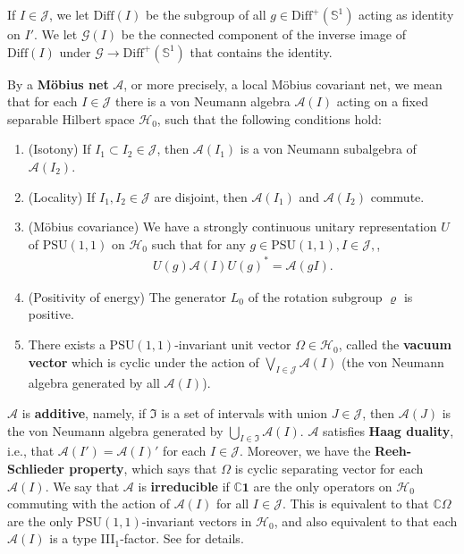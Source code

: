 \documentclass[11pt,b5paper,notitlepage]{article}
\theoremstyle{definition}
\theoremstyle{plain}
\newcommand{\fk}{\mathfrak}
\newcommand{\mc}{\mathcal}
\newcommand{\id}{\mathbf{1}}
\newcommand{\Diffp}{\mathrm{Diff}^+}
\newcommand{\Diff}{\mathrm{Diff}}
\newcommand{\PSU}{\mathrm{PSU}(1,1)}
\newcommand{\scr}{\mathscr}
\newcommand{\mbb}{\mathbb}
\newcommand{\Cbb}{\mathbb C}
\newcommand{\Sbb}{{\mathbb S}}
\numberwithin{equation}{section}
\begin{document}
If $I\in\mc J$, we let $\Diff(I)$ be the subgroup of all $g\in\Diffp(\mbb S^1)$ acting as identity on $I'$. We let $\scr G(I)$ be the connected component of the inverse image of $\Diff(I)$ under $\scr G\rightarrow\Diffp(\Sbb^1)$ that contains the identity.

By a  \textbf{M\"obius net} $\mc A$, or more precisely, a local M\"obius covariant net, we mean that for each $I\in\mathcal J$ there is a von Neumann algebra $\mathcal A(I)$ acting on a fixed separable Hilbert space $\mathcal H_0$, such that the following conditions hold:
\begin{enumerate}[label=(\alph*)]
\item (Isotony) If $I_1\subset I_2\in\mathcal J$, then $\mathcal A(I_1)$ is a von Neumann subalgebra of $\mathcal A(I_2)$.
\item (Locality) If $I_1,I_2\in\mathcal J$ are disjoint, then $\mathcal A(I_1)$ and $\mathcal A(I_2)$ commute.
\item (M\"obius covariance) We have a strongly continuous  unitary representation $U$ of $\PSU$ on $\mc H_0$ such that for any $g\in\PSU, I\in\mc J,$, 
\begin{align*}
	U(g)\mc A(I)U(g)^*=\mc A(gI).
\end{align*}
\item (Positivity of energy) The generator $L_0$ of the rotation subgroup $\varrho$  is positive.
\item There exists a $\PSU$-invariant unit vector $\Omega\in\mc H_0$, called the \textbf{vacuum vector} which is  cyclic under the action of $\bigvee_{I\in\mathcal J}\mathcal A(I)$ (the von Neumann algebra generated by all $\mathcal A(I)$).
\end{enumerate}

$\mc A$ is \textbf{additive}, namely, if $\fk I$ is a set of intervals with union $J\in\mc J$, then $\mc A(J)$ is the von Neumann algebra generated by $\bigcup_{I\in\fk I}\mc A(I)$. $\mc A$ satisfies \textbf{Haag duality}, i.e., that $\mc A(I')=\mc A(I)'$ for each $I\in \mc J$. Moreover, we have the \textbf{Reeh-Schlieder property}, which says that $\Omega$ is  cyclic separating vector for each $\mc A(I)$. We say that $\mc A$ is \textbf{irreducible} if $\Cbb \id$ are the only operators on $\mc H_0$ commuting with the action of $\mc A(I)$ for all $I\in\mc J$. This is equivalent to that $\Cbb\Omega$ are the only $\PSU$-invariant vectors in $\mc H_0$, and also equivalent to that each $\mc A(I)$ is a type III$_1$-factor.  See \cite[Sec. 1]{GL96} for details.
\end{document}
